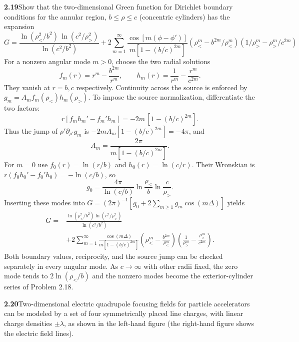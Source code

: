 \par\bigskip
\noindent\textbf{2.19}\quad Show that the two-dimensional Green function for Dirichlet boundary conditions for the annular region, $b\leq\rho\leq c$ (concentric cylinders) has the expansion
\[
G=\frac{\ln(\rho_{<}^{2}/b^{2})\,\ln(c^{2}/\rho_{>}^{2})}{\ln(c^{2}/b^{2})}+2\sum_{m=1}^{\infty}\frac{\cos[m(\phi-\phi')]}{m[1-(b/c)^{2m}]}\left(\rho_{<}^{m}-b^{2m}/\rho_{<}^{m}\right)\left(1/\rho_{>}^{m}-\rho_{>}^{m}/c^{2m}\right)
\]
\solution
For a nonzero angular mode $m>0$, choose the two radial solutions
\[
f_m(r)=r^m-\frac{b^{2m}}{r^m},\qquad
h_m(r)=\frac1{r^m}-\frac{r^m}{c^{2m}}.
\]
They vanish at $r=b,c$ respectively. Continuity across the source
is enforced by $g_m=A_m f_m(\rho_<)h_m(\rho_>)$.
To impose the source normalization, differentiate the two factors:
\[
r[f_mh_m'-f_m'h_m]=-2m\,[1-(b/c)^{2m}].
\]
Thus the jump of $\rho'\partial_{\rho'}g_m$ is
$-2mA_m[1-(b/c)^{2m}]=-4\pi$, and
\[
A_m=\frac{2\pi}{m[1-(b/c)^{2m}]}.
\]
For $m=0$ use $f_0(r)=\ln(r/b)$ and $h_0(r)=\ln(c/r)$.
Their Wronskian is
$r(f_0h_0'-f_0'h_0)=-\ln(c/b)$, so
\[
g_0=\frac{4\pi}{\ln(c/b)}
                 \ln\frac{\rho_<}b\ln\frac c{\rho_>}.
\]
Inserting these modes into
$G=(2\pi)^{-1}[g_0+2\sum_{m\geq1}g_m\cos(m\Delta)]$ yields
\[
\boxed{\begin{aligned}
G={}&\frac{\ln(\rho_<^2/b^2)\ln(c^2/\rho_>^2)}{\ln(c^2/b^2)}\\
&+2\sum_{m=1}^\infty
 \frac{\cos(m\Delta)}{m[1-(b/c)^{2m}]}
 \left(\rho_<^m-\frac{b^{2m}}{\rho_<^m}\right)
 \left(\frac1{\rho_>^m}-\frac{\rho_>^m}{c^{2m}}\right).
\end{aligned}}
\]
Both boundary values, reciprocity, and the source jump can be checked
separately in every angular mode. As $c\to\infty$ with other radii
fixed, the zero mode tends to $2\ln(\rho_</b)$ and the nonzero modes
become the exterior-cylinder series of Problem 2.18.

\par\bigskip
\noindent\textbf{2.20}\quad Two-dimensional electric quadrupole focusing fields for particle accelerators can be modeled by a set of four symmetrically placed line charges, with linear charge densities $\pm\lambda$, as shown in the left-hand figure (the right-hand figure shows the electric field lines).

